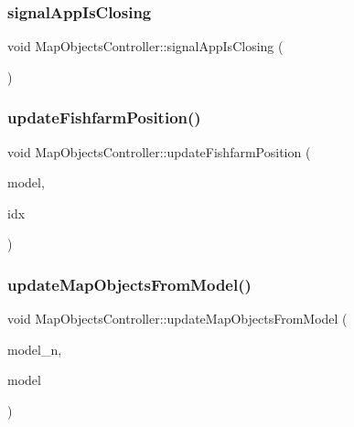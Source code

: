 \subsubsection{\texorpdfstring{signalAppIsClosing}{signalAppIsClosing}}
{\footnotesize\ttfamily void Map\+Objects\+Controller\+::signal\+App\+Is\+Closing (\begin{DoxyParamCaption}{ }\end{DoxyParamCaption})\hspace{0.3cm}{\ttfamily [slot]}}

\mbox{\label{class_map_objects_controller_a9ebf2f570895131ed8f215ac4016ae93}} 
\subsubsection{\texorpdfstring{updateFishfarmPosition()}{updateFishfarmPosition()}}
{\footnotesize\ttfamily void Map\+Objects\+Controller\+::update\+Fishfarm\+Position (\begin{DoxyParamCaption}\item[{int}]{model,  }\item[{int}]{idx }\end{DoxyParamCaption})}

\mbox{\label{class_map_objects_controller_a9a597f7b8a7c151860bd36ff974a861b}} 
\subsubsection{\texorpdfstring{updateMapObjectsFromModel()}{updateMapObjectsFromModel()}}
{\footnotesize\ttfamily void Map\+Objects\+Controller\+::update\+Map\+Objects\+From\+Model (\begin{DoxyParamCaption}\item[{int}]{model\+\_\+n,  }\item[{\mbox{\hyperlink{class_displace_model}{Displace\+Model}} $\ast$}]{model }\end{DoxyParamCaption})}

